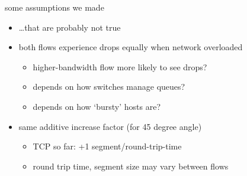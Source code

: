 \begin{frame}{some assumptions we made}
    \begin{itemize}
    \item \ldots that are probably not true
    \vspace{.5cm}
    \item both flows experience drops equally when network overloaded
        \begin{itemize}
        \item higher-bandwidth flow more likely to see drops?
        \item depends on how switches manage queues?
        \item depends on how `bursty' hosts are?
        \end{itemize}
    \item same additive increase factor (for 45 degree angle)
        \begin{itemize}
        \item TCP so far: +1 segment/round-trip-time
        \item round trip time, segment size may vary between flows
        \end{itemize}
    \end{itemize}
\end{frame}
